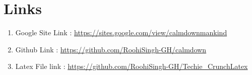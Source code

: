 \section{Links}
\begin{enumerate}
    \item Google Site Link :
\url{https://sites.google.com/view/calmdownmankind}
\item Github Link : 
\url{https://github.com/RoohiSingh-GH/calmdown}
\item Latex File link : \url{https://github.com/RoohiSingh-GH/Techie_CrunchLatex}
\end{enumerate}
